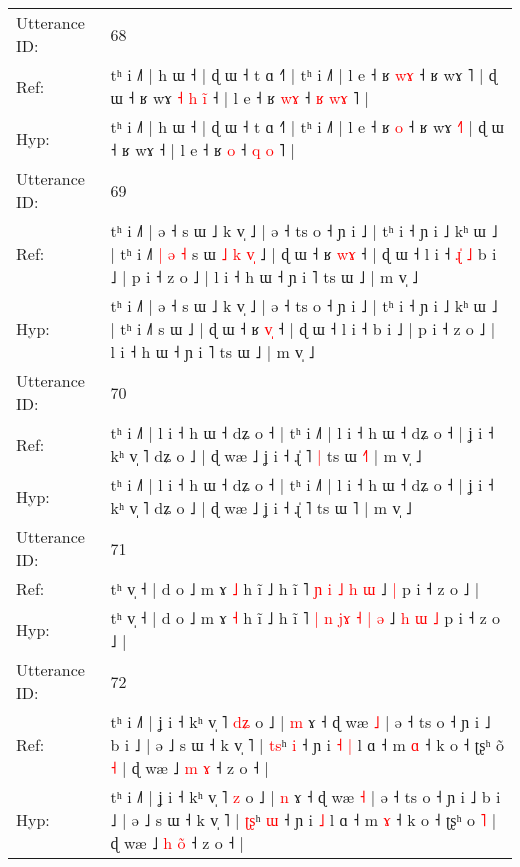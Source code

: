 \documentclass[10pt]{article}
\DeclareRobustCommand{\hl}[1]{{\textcolor{red}{#1}}}
\begin{document}
\begin{longtable}{ll}
\midrule
Utterance ID: & 68 \\
Ref: & tʰ i ˩˥ | h ɯ ˧ | ɖ ɯ ˧ t ɑ ˧˥ | tʰ i ˩˥ | l e ˧ ʁ \hl{w}\hl{ɤ} ˧ ʁ wɤ \hl{}˥ | ɖ ɯ ˧ ʁ wɤ\hl{ }\hl{˧}\hl{ }\hl{h}\hl{ }\hl{i}\hl{̃} ˧ | l e ˧ ʁ \hl{w}\hl{ɤ} ˧ \hl{ʁ} \hl{w}\hl{ɤ} ˥ |
 \\
Hyp: & tʰ i ˩˥ | h ɯ ˧ | ɖ ɯ ˧ t ɑ ˧˥ | tʰ i ˩˥ | l e ˧ ʁ \hl{}\hl{o} ˧ ʁ wɤ \hl{˧}˥ | ɖ ɯ ˧ ʁ wɤ\hl{}\hl{}\hl{}\hl{}\hl{}\hl{}\hl{} ˧ | l e ˧ ʁ \hl{}\hl{o} ˧ \hl{q} \hl{}\hl{o} ˥ |
 \\
\midrule
Utterance ID: & 69 \\
Ref: & tʰ i ˩˥ | ə ˧ s ɯ ˩ k v̩ ˩ | ə ˧ ts o ˧ ɲ i ˩ | tʰ i ˧ ɲ i ˩ kʰ ɯ ˩ | tʰ i ˩˥\hl{ }\hl{|}\hl{ }\hl{ə}\hl{ }\hl{˧} s ɯ\hl{ }\hl{˩}\hl{ }\hl{k}\hl{ }\hl{v}\hl{̩} ˩ | ɖ ɯ ˧ ʁ \hl{w}\hl{ɤ} ˧ | ɖ ɯ ˧ l i ˧\hl{ }\hl{ɻ}\hl{̍}\hl{ }\hl{˩} b i ˩ | p i ˧ z o ˩ | l i ˧ h ɯ ˧ ɲ i ˥ ts ɯ ˩ | m v̩ ˩
 \\
Hyp: & tʰ i ˩˥ | ə ˧ s ɯ ˩ k v̩ ˩ | ə ˧ ts o ˧ ɲ i ˩ | tʰ i ˧ ɲ i ˩ kʰ ɯ ˩ | tʰ i ˩˥\hl{}\hl{}\hl{}\hl{}\hl{}\hl{} s ɯ\hl{}\hl{}\hl{}\hl{}\hl{}\hl{}\hl{} ˩ | ɖ ɯ ˧ ʁ \hl{v}\hl{̩} ˧ | ɖ ɯ ˧ l i ˧\hl{}\hl{}\hl{}\hl{}\hl{} b i ˩ | p i ˧ z o ˩ | l i ˧ h ɯ ˧ ɲ i ˥ ts ɯ ˩ | m v̩ ˩
 \\
\midrule
Utterance ID: & 70 \\
Ref: & tʰ i ˩˥ | l i ˧ h ɯ ˧ dʑ o ˧ | tʰ i ˩˥ | l i ˧ h ɯ ˧ dʑ o ˧ | ʝ i ˧ kʰ v̩ ˥ dʑ o ˩ | ɖ wæ ˩ ʝ i ˧ ɻ̍ ˥\hl{ }\hl{|} ts ɯ \hl{˧}˥ | m v̩ ˩
 \\
Hyp: & tʰ i ˩˥ | l i ˧ h ɯ ˧ dʑ o ˧ | tʰ i ˩˥ | l i ˧ h ɯ ˧ dʑ o ˧ | ʝ i ˧ kʰ v̩ ˥ dʑ o ˩ | ɖ wæ ˩ ʝ i ˧ ɻ̍ ˥\hl{}\hl{} ts ɯ \hl{}˥ | m v̩ ˩
 \\
\midrule
Utterance ID: & 71 \\
Ref: & tʰ v̩ ˧ | d o ˩ m ɤ \hl{˩} h ĩ ˩ h ĩ ˥\hl{}\hl{} \hl{ɲ} \hl{}\hl{i} \hl{˩} \hl{h} \hl{ɯ} ˩\hl{}\hl{}\hl{}\hl{} \hl{|} p i ˧ z o ˩ |
 \\
Hyp: & tʰ v̩ ˧ | d o ˩ m ɤ \hl{˧} h ĩ ˩ h ĩ ˥\hl{ }\hl{|} \hl{n} \hl{j}\hl{ɤ} \hl{˧} \hl{|} \hl{ə} ˩\hl{ }\hl{h}\hl{ }\hl{ɯ} \hl{˩} p i ˧ z o ˩ |
 \\
\midrule
Utterance ID: & 72 \\
Ref: & tʰ i ˩˥ | ʝ i ˧ kʰ v̩ ˥ \hl{d}\hl{ʑ} o ˩ | \hl{m} ɤ ˧ ɖ wæ \hl{˩} | ə ˧ ts o ˧ ɲ i ˩ b i ˩ | ə ˩ s ɯ ˧ k v̩ ˥ | \hl{t}\hl{s}ʰ \hl{i} ˧ ɲ i\hl{ }\hl{˧} \hl{|} l ɑ ˧ m \hl{ɑ} ˧ k o ˧ ʈʂʰ o\hl{̃} \hl{˧} | ɖ wæ ˩ \hl{m} \hl{}\hl{ɤ} ˧ z o ˧ |
 \\
Hyp: & tʰ i ˩˥ | ʝ i ˧ kʰ v̩ ˥ \hl{}\hl{z} o ˩ | \hl{n} ɤ ˧ ɖ wæ \hl{˧} | ə ˧ ts o ˧ ɲ i ˩ b i ˩ | ə ˩ s ɯ ˧ k v̩ ˥ | \hl{ʈ}\hl{ʂ}ʰ \hl{ɯ} ˧ ɲ i\hl{}\hl{} \hl{˩} l ɑ ˧ m \hl{ɤ} ˧ k o ˧ ʈʂʰ o\hl{} \hl{˥} | ɖ wæ ˩ \hl{h} \hl{o}\hl{̃} ˧ z o ˧ |

\end{longtable}
\end{document}
